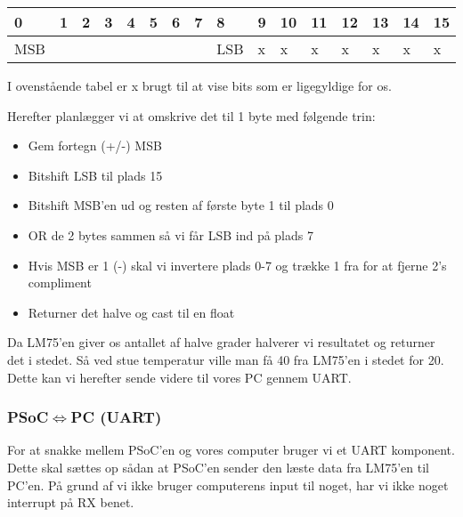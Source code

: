 \documentclass[../main.tex]{subfiles}
\begin{document}
\begin{table}[h]
    \centering
    \begin{tabular}{|llllllllllllllll|}
    \hline
    \multicolumn{1}{|l|}{0}   & \multicolumn{1}{l|}{1} & \multicolumn{1}{l|}{2}  & \multicolumn{1}{l|}{3}  & \multicolumn{1}{l|}{4}  & \multicolumn{1}{l|}{5}  & \multicolumn{1}{l|}{6}  & \multicolumn{1}{l|}{7}  & \multicolumn{1}{|l|}{8}   & \multicolumn{1}{l|}{9} & \multicolumn{1}{l|}{10} & \multicolumn{1}{l|}{11} & \multicolumn{1}{l|}{12} & \multicolumn{1}{l|}{13} & \multicolumn{1}{l|}{14} & \multicolumn{1}{l|}{15} \\ \hline
    MSB &                        &                         &                         &                         &                         &                         &                      & \multicolumn{1}{l|}{LSB} & \multicolumn{1}{l|}{x} & \multicolumn{1}{l|}{x}  & \multicolumn{1}{l|}{x}  & \multicolumn{1}{l|}{x}  & \multicolumn{1}{l|}{x}  & \multicolumn{1}{l|}{x}  & \multicolumn{1}{l|}{x}  \\ \hline    
    \end{tabular}
\end{table}
I ovenstående tabel er x brugt til at vise bits som er ligegyldige for os.

Herefter planlægger vi at omskrive det til 1 byte med følgende trin:
\begin{itemize}
    \item Gem fortegn (+/-) MSB
    \item Bitshift LSB til plads 15
    \item Bitshift MSB'en ud og resten af første byte 1 til plads 0
    \item OR de 2 bytes sammen så vi får LSB ind på plads 7
    \item Hvis MSB er 1 (-) skal vi invertere plads 0-7 og trække 1 fra for at fjerne 2's compliment
    \item Returner det halve og cast til en float
\end{itemize}
Da LM75'en giver os antallet af halve grader halverer vi resultatet og returner det i stedet. Så ved stue temperatur ville man få 40 fra LM75'en i stedet for 20.
Dette kan vi herefter sende videre til vores PC gennem UART.

\subsubsection{PSoC$\iff$PC (UART)}
For at snakke mellem PSoC'en og vores computer bruger vi et UART komponent. Dette skal sættes op sådan at PSoC'en sender den læste data fra LM75'en til PC'en.
På grund af vi ikke bruger computerens input til noget, har vi ikke noget interrupt på RX benet.
\end{document}
